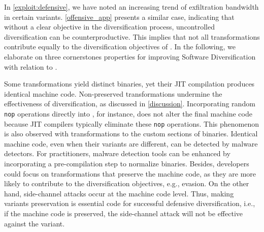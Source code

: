 \label{exploit:discussion}
In \autoref{exploit:defensive}, we have noted an increasing trend of exfiltration bandwidth in certain variants. 
\autoref{offensive_app} presents a similar case, indicating that without a clear objective in the diversification process, uncontrolled diversification can be counterproductive. 
This implies that not all transformations contribute equally to the diversification objectives of \Wasm.
In the following, we elaborate on three cornerstones properties for improving Software Diversification with relation to \Wasm.

Some transformations yield distinct \Wasm binaries, yet their JIT compilation produces identical machine code.
Non-preserved transformations undermine the effectiveness of diversification, as discussed in \autoref{discussion}.
Incorporating random \texttt{nop} operations directly into \Wasm, for instance, does not alter the final machine code because JIT compilers typically eliminate these \texttt{nop} operations.
This phenomenon is also observed with transformations to the custom sections of \Wasm binaries.
Identical machine code, even when their \Wasm variants are different, can be detected by malware detectors.
For practitioners, malware detection tools can be enhanced by incorporating a pre-compilation step to normalize \Wasm binaries.
Besides, developers could focus on transformations that preserve the machine code, as they are more likely to contribute to the diversification objectives, e.g., evasion.
On the other hand, side-channel attacks occur at the machine code level.
Thus, making \Wasm variants preservation is essential code for successful defensive diversification, i.e., if the machine code is preserved, the side-channel attack will not be effective against the \Wasm variant.


 
